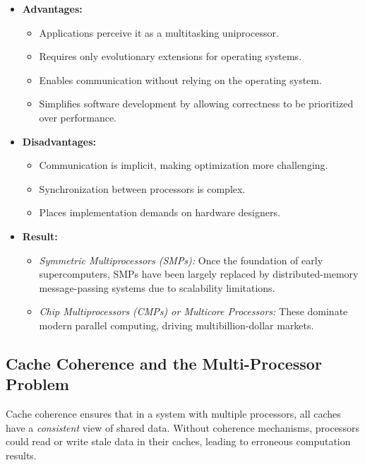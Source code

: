 \begin{itemize}
    \item \textbf{Advantages:}
    \begin{itemize}
        \item Applications perceive it as a multitasking uniprocessor.
        \item Requires only evolutionary extensions for operating systems.
        \item Enables communication without relying on the operating system.
        \item Simplifies software development by allowing correctness to be prioritized over performance.
    \end{itemize}

    \item \textbf{Disadvantages:}
    \begin{itemize}
        \item Communication is implicit, making optimization more challenging.
        \item Synchronization between processors is complex.
        \item Places implementation demands on hardware designers.
    \end{itemize}

    \item \textbf{Result:}
    \begin{itemize}
        \item \emph{Symmetric Multiprocessors (SMPs):} Once the foundation of early supercomputers, SMPs have been largely replaced by distributed-memory message-passing systems due to scalability limitations.
        \item \emph{Chip Multiprocessors (CMPs) or Multicore Processors:} These dominate modern parallel computing, driving multibillion-dollar markets.
    \end{itemize}
\end{itemize}

\subsection{Cache Coherence and the Multi-Processor Problem}
\label{subsec:cache-coherence}

Cache coherence ensures that in a system with multiple processors,
all caches have a \emph{consistent} view of shared data. Without
coherence mechanisms, processors could read or write stale data in
their caches, leading to erroneous computation results.

